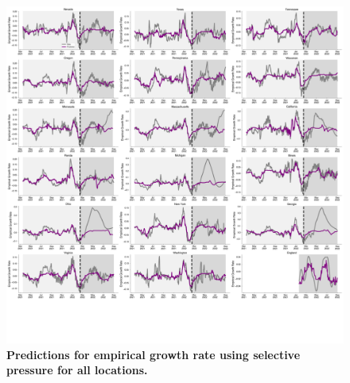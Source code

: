 \documentclass[12pt,oneside,letterpaper]{article}
\begin{document}
\begin{figure}[t!]
    \centering
    \includegraphics[width=0.9\textwidth=0.01]{./supplementary_figures/empirical-growth-rate-predictions-all.png}
    \caption{
        \textbf{Predictions for empirical growth rate using selective pressure for all locations.}
    }
    \label{fig:empirical-growth-rate-predictions-all}
\end{figure}
\end{document}
